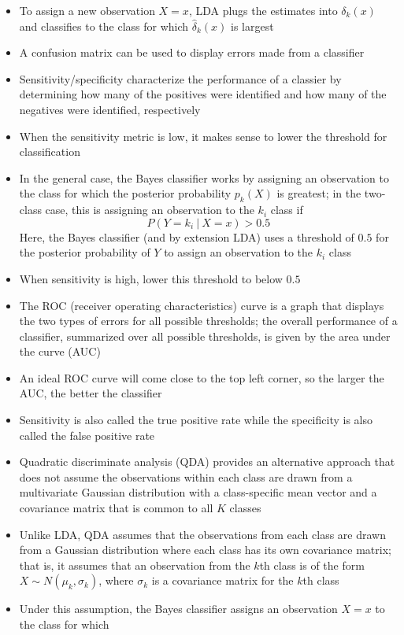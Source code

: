 \documentclass[12pt]{article}
\begin{document}
\begin{itemize}
\item To assign a new observation $X=x$, LDA plugs the estimates into $\delta_k(x)$ and classifies to the class for which $\hat{\delta}_k(x)$ is largest 
\item A confusion matrix can be used to display errors made from a classifier 
\item Sensitivity/specificity characterize the performance of a classier by determining how many of the positives were identified and how many of the negatives were identified, respectively
\item When the sensitivity metric is low, it makes sense to lower the threshold for classification
\item In the general case, the Bayes classifier works by assigning an observation to the class for which the posterior probability $p_k(X)$ is greatest; in the two-class case, this is assigning an observation to the $k_i$ class if $$ P(Y=k_i~|~X=x) > 0.5$$ Here, the Bayes classifier (and by extension LDA) uses a threshold of $0.5$ for the posterior probability of $Y$ to assign an observation to the $k_i$ class 
\item When sensitivity is high, lower this threshold to below $0.5$ 
\item The ROC (receiver operating characteristics) curve is a graph that displays the two types of errors for all possible thresholds; the overall performance of a classifier, summarized over all possible thresholds, is given by the area under the curve (AUC)
\item An ideal ROC curve will come close to the top left corner, so the larger the AUC, the better the classifier 
\item Sensitivity is also called the true positive rate while the specificity is also called the false positive rate 
\item Quadratic discriminate analysis (QDA) provides an alternative approach that does not assume the observations within each class are drawn from a multivariate Gaussian distribution with a class-specific mean vector and a covariance matrix that is common to all $K$ classes 
\item Unlike LDA, QDA assumes that the observations from each class are drawn from a Gaussian distribution where each class has its own covariance matrix; that is, it assumes that an observation from the $k$th class is of the form $X\sim N(\mu_k, \sigma_k)$, where $\sigma_k$ is a covariance matrix for the $k$th class 
\item Under this assumption, the Bayes classifier assigns an observation $X=x$ to the class for which $$ \begin{aligned} 

\end{aligned}$$
\end{itemize}
\end{document}
